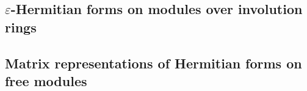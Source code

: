 \subsection{$\varepsilon$-Hermitian forms on modules over involution rings}







\subsection{Matrix representations of Hermitian forms on free modules}




